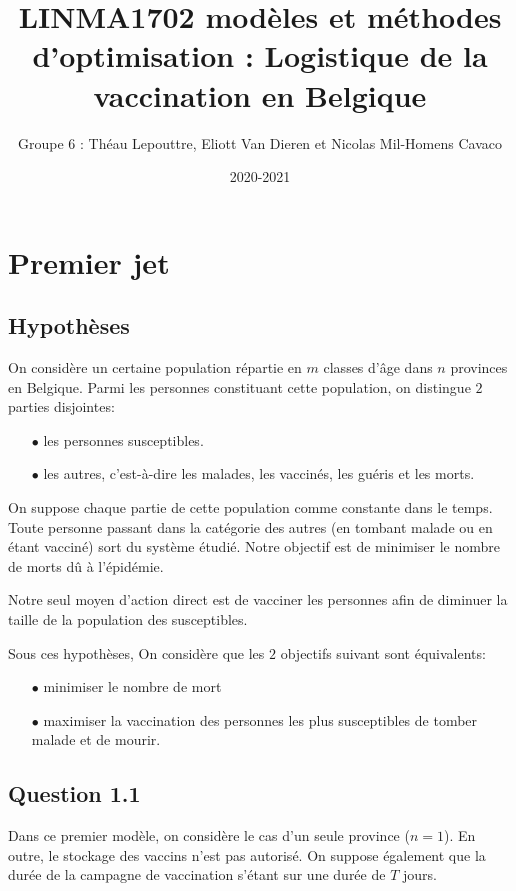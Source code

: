 \documentclass[a4paper,11pt]{report}
\title{LINMA1702 modèles et méthodes d'optimisation : 
Logistique de la vaccination en Belgique
}
\author{Groupe 6 : Théau Lepouttre, Eliott Van Dieren et Nicolas Mil-Homens Cavaco}
\date{2020-2021}
\begin{document}
\maketitle
\section{Premier jet}

\subsection{Hypothèses}
On considère un certaine population répartie en $m$ classes d'âge dans $n$ provinces en Belgique.
Parmi les personnes constituant cette population, on distingue $2$ parties disjointes:

\begin{itemize}
\item[$\bullet$]  les personnes susceptibles. 
\item[$\bullet$]  les autres, c'est-à-dire les malades, les vaccinés, les guéris et les morts.
\end{itemize}

On suppose chaque partie de cette population comme constante dans le temps.
Toute personne passant dans la catégorie des autres (en tombant malade ou en étant vacciné) sort du système étudié. 
Notre objectif est de minimiser le nombre de morts dû à l'épidémie.

Notre seul moyen d'action direct est de vacciner les personnes afin de diminuer la taille de la population des susceptibles. 

Sous ces hypothèses, On considère que les $2$ objectifs suivant sont équivalents:
\begin{itemize}
\item[$\bullet$] minimiser le nombre de mort 
\item[$\bullet$] maximiser la vaccination des personnes les plus susceptibles de tomber malade et de mourir.
\end{itemize}

\subsection{Question 1.1}

Dans ce premier modèle, on considère le cas d'un seule province ($n=1$).
En outre, le stockage des vaccins n'est pas autorisé.
On suppose également que la durée de la campagne de vaccination s'étant sur une durée de $T$ jours.
\end{document}
